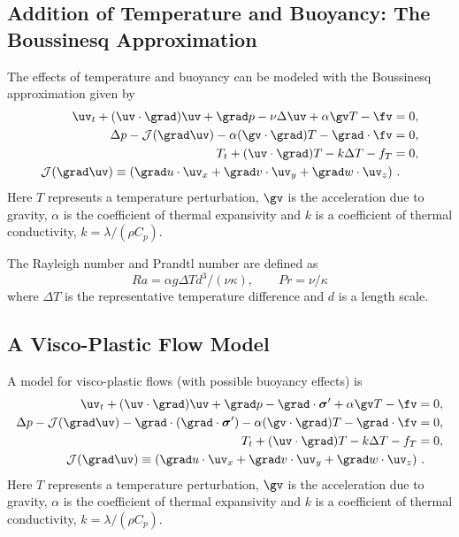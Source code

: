 \documentclass[12pt]{article}
\begin{document}
\newcommand{\Jc}{{\mathcal J}}
\subsection{Addition of Temperature and Buoyancy: The Boussinesq Approximation}


The effects of temperature and buoyancy can be modeled with the Boussinesq approximation
given by
\begin{align*}
  \uv_t + (\uv\cdot\grad)\uv + \grad p -\nu \Delta \uv +\alpha \gv T  -\fv &=0 ,\\
  \Delta p - \Jc(\grad\uv) -\alpha (\gv\cdot\grad) T - \grad\cdot\fv &=0,  \\
  T_t + (\uv\cdot\grad) T - k \Delta T - f_T &=0 , \\
  \Jc(\grad\uv) \equiv (\grad u\cdot\uv_x + \grad v\cdot\uv_y + \grad w\cdot \uv_z) &~.
\end{align*}
Here $T$ represents a temperature perturbation, $\gv$ is the acceleration due to gravity,
$\alpha$ is the coefficient of thermal expansivity and $k$ is a coefficient of
thermal conductivity, $k=\lambda/(\rho C_p)$. 


The Rayleigh number and Prandtl number are defined
as
\[
   Ra = \alpha g \Delta T d^3 /(\nu\kappa), \qquad Pr = \nu/\kappa 
\]
where $\Delta T$ is the representative temperature difference and $d$ is a length scale. 



\subsection{A Visco-Plastic Flow Model}

A model for visco-plastic flows (with possible buoyancy effects) is
\begin{align*}
  \uv_t + (\uv\cdot\grad)\uv + \grad p - \grad\cdot \sigmav' +\alpha \gv T  -\fv &=0 ,\\
  \Delta p - \Jc(\grad\uv) -\grad\cdot(\grad\cdot \sigmav') 
                -\alpha (\gv\cdot\grad) T - \grad\cdot\fv &=0,  \\
  T_t + (\uv\cdot\grad) T - k \Delta T - f_T &=0 , \\
  \Jc(\grad\uv) \equiv (\grad u\cdot\uv_x + \grad v\cdot\uv_y + \grad w\cdot \uv_z) &~.
\end{align*}
Here $T$ represents a temperature perturbation, $\gv$ is the acceleration due to gravity,
$\alpha$ is the coefficient of thermal expansivity and $k$ is a coefficient of
thermal conductivity, $k=\lambda/(\rho C_p)$. 
\end{document}

